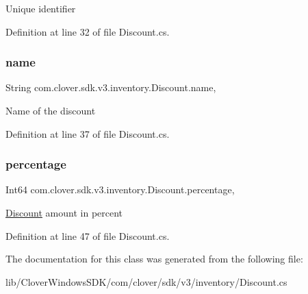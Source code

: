 Unique identifier 



Definition at line 32 of file Discount.\+cs.

\mbox{\label{classcom_1_1clover_1_1sdk_1_1v3_1_1inventory_1_1_discount_abd67ee6bdce03523e0c1a329db48ab6a}} 
\subsubsection{\texorpdfstring{name}{name}}
{\footnotesize\ttfamily String com.\+clover.\+sdk.\+v3.\+inventory.\+Discount.\+name\hspace{0.3cm}{\ttfamily [get]}, {\ttfamily [set]}}



Name of the discount 



Definition at line 37 of file Discount.\+cs.

\mbox{\label{classcom_1_1clover_1_1sdk_1_1v3_1_1inventory_1_1_discount_aa3da776e68604e2725f96b48e4fcfdad}} 
\subsubsection{\texorpdfstring{percentage}{percentage}}
{\footnotesize\ttfamily Int64 com.\+clover.\+sdk.\+v3.\+inventory.\+Discount.\+percentage\hspace{0.3cm}{\ttfamily [get]}, {\ttfamily [set]}}



\hyperlink{classcom_1_1clover_1_1sdk_1_1v3_1_1inventory_1_1_discount}{Discount} amount in percent 



Definition at line 47 of file Discount.\+cs.



The documentation for this class was generated from the following file\+:\begin{DoxyCompactItemize}
\item 
lib/\+Clover\+Windows\+S\+D\+K/com/clover/sdk/v3/inventory/Discount.\+cs\end{DoxyCompactItemize}
